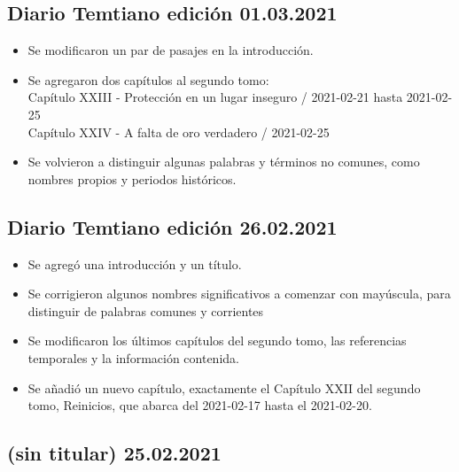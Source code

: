 \documentclass[
]{book}
\begin{document}
\hypertarget{diario-temtiano-ediciuxf3n-01.03.2021}{%
\subsection*{Diario Temtiano edición 01.03.2021}\label{diario-temtiano-ediciuxf3n-01.03.2021}}

\begin{itemize}
\item
  Se modificaron un par de pasajes en la introducción.
\item
  Se agregaron dos capítulos al segundo tomo:~\\
  Capítulo XXIII - Protección en un lugar inseguro / 2021-02-21 hasta 2021-02-25~\\
  Capítulo XXIV - A falta de oro verdadero / 2021-02-25
\item
  Se volvieron a distinguir algunas palabras y términos no comunes, como nombres propios y periodos históricos.
\end{itemize}

\hypertarget{diario-temtiano-ediciuxf3n-26.02.2021}{%
\subsection*{Diario Temtiano edición 26.02.2021}\label{diario-temtiano-ediciuxf3n-26.02.2021}}

\begin{itemize}
\item
  Se agregó una introducción y un título.
\item
  Se corrigieron algunos nombres significativos a comenzar con mayúscula, para distinguir de palabras comunes y corrientes
\item
  Se modificaron los últimos capítulos del segundo tomo, las referencias temporales y la información contenida.
\item
  Se añadió un nuevo capítulo, exactamente el Capítulo XXII del segundo tomo, Reinicios, que abarca del 2021-02-17 hasta el 2021-02-20.
\end{itemize}

\hypertarget{sin-titular-25.02.2021}{%
\subsection*{(sin titular) 25.02.2021}\label{sin-titular-25.02.2021}}
\end{document}
